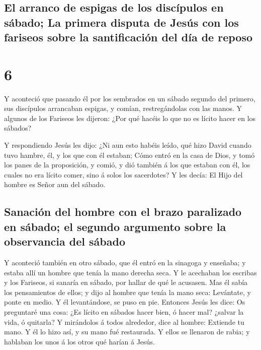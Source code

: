 \hypertarget{el-arranco-de-espigas-de-los-discuxedpulos-en-suxe1bado-la-primera-disputa-de-jesuxfas-con-los-fariseos-sobre-la-santificaciuxf3n-del-duxeda-de-reposo}{%
\subsection{El arranco de espigas de los discípulos en sábado; La
primera disputa de Jesús con los fariseos sobre la santificación del día
de
reposo}\label{el-arranco-de-espigas-de-los-discuxedpulos-en-suxe1bado-la-primera-disputa-de-jesuxfas-con-los-fariseos-sobre-la-santificaciuxf3n-del-duxeda-de-reposo}}

\hypertarget{section-42-6}{%
\section{6}\label{section-42-6}}

 Y aconteció que pasando él por los sembrados en un sábado
segundo del primero, sus discípulos arrancaban espigas, y comían,
restregándolas con las manos.  Y algunos de los Fariseos
les dijeron: ¿Por qué hacéis lo que no es lícito hacer en los sábados?

 Y respondiendo Jesús les dijo: ¿Ni aun esto habéis leído,
qué hizo David cuando tuvo hambre, él, y los que con él estaban;
 Cómo entró en la casa de Dios, y tomó los panes de la
proposición, y comió, y dió también á los que estaban con él, los cuales
no era lícito comer, sino á solos los sacerdotes?  Y les
decía: El Hijo del hombre es Señor aun del sábado.

\hypertarget{sanaciuxf3n-del-hombre-con-el-brazo-paralizado-en-suxe1bado-el-segundo-argumento-sobre-la-observancia-del-suxe1bado}{%
\subsection{Sanación del hombre con el brazo paralizado en sábado; el
segundo argumento sobre la observancia del
sábado}\label{sanaciuxf3n-del-hombre-con-el-brazo-paralizado-en-suxe1bado-el-segundo-argumento-sobre-la-observancia-del-suxe1bado}}

 Y aconteció también en otro sábado, que él entró en la
sinagoga y enseñaba; y estaba allí un hombre que tenía la mano derecha
seca.  Y le acechaban los escribas y los Fariseos, si
sanaría en sábado, por hallar de qué le acusasen.  Mas él
sabía los pensamientos de ellos; y dijo al hombre que tenía la mano
seca: Levántate, y ponte en medio. Y él levantándose, se puso en pie.
 Entonces Jesús les dice: Os preguntaré una cosa: ¿Es
lícito en sábados hacer bien, ó hacer mal? ¿salvar la vida, ó quitarla?
 Y mirándolos á todos alrededor, dice al hombre: Extiende
tu mano. Y él lo hizo así, y su mano fué restaurada.  Y
ellos se llenaron de rabia; y hablaban los unos á los otros qué harían á
Jesús.

